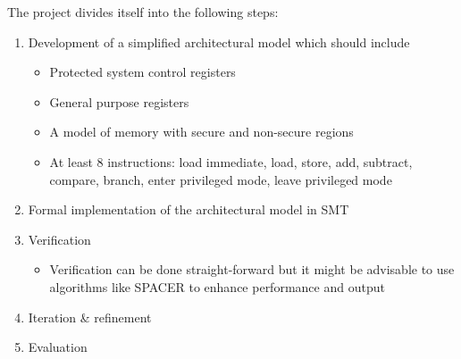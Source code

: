 \documentclass{securem}
\begin{document}
The project divides itself into the following steps:
\begin{enumerate}
    \item Development of a simplified architectural model which should include
    \begin{itemize}
        \item Protected system control registers
        \item General purpose registers
        \item A model of memory with secure and non-secure regions
        \item At least 8 instructions: load immediate, load, store, add, subtract, compare, branch, enter privileged mode, leave privileged mode
    \end{itemize}
    \item Formal implementation of the architectural model in SMT
    \item Verification
    \begin{itemize}
        \item Verification can be done straight-forward but it might be advisable to use algorithms like SPACER to enhance performance and output
    \end{itemize}
    \item Iteration \& refinement
    \item Evaluation
\end{enumerate}



\end{document}
